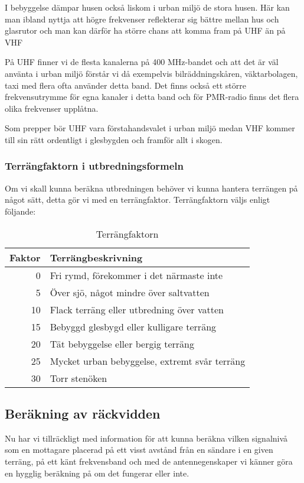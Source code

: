 I bebyggelse dämpar husen också liskom i urban miljö de stora husen. Här kan man ibland nyttja att högre frekvenser reflekterar sig bättre mellan hus och glasrutor och man kan därför ha större chans att komma fram på UHF än på VHF

På UHF finner vi de flesta kanalerna på 400 MHz-bandet och att det är väl använta i urban miljö förstår vi då exempelvis bilräddningskåren, väktarbolagen, taxi med flera ofta använder detta band. Det finns också ett större frekvensutrymme för egna kanaler i detta band och för PMR-radio finns det flera olika frekvenser upplåtna.

Som prepper bör UHF vara förstahandsvalet i urban miljö medan VHF kommer till sin rätt ordentligt i glesbygden och framför allt i skogen.

\subsubsection{Terrängfaktorn i utbredningsformeln}

Om vi skall kunna beräkna utbredningen behöver vi kunna hantera terrängen på något sätt, detta gör vi med en terrängfaktor. Terrängfaktorn väljs enligt följande:

\begin{table}[h]
\centering
\begin{tabular}{rl}
	Faktor & Terrängbeskrivning                            \\ \hline
	     0 & Fri rymd, förekommer i det närmaste inte      \\
	     5 & Över sjö, något mindre över saltvatten        \\
	    10 & Flack terräng eller utbredning över vatten    \\
	    15 & Bebyggd glesbygd eller kulligare terräng      \\
	    20 & Tät bebyggelse eller bergig terräng           \\
	    25 & Mycket urban bebyggelse, extremt svår terräng \\
	    30 & Torr stenöken
\end{tabular}
\caption{Terrängfaktorn}
\end{table}

\subsection{Beräkning av räckvidden}

Nu har vi tillräckligt med information för att kunna beräkna vilken signalnivå som en mottagare placerad på ett visst avstånd från en sändare i en given terräng, på ett känt frekvensband och med de antennegenskaper vi känner göra en hygglig beräkning på om det fungerar eller inte.

